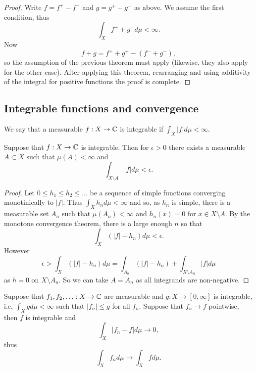 \documentclass[twoside, a4paper, 10pt]{amsart}
\begin{document}
\begin{proof} Write $f = f^+ - f^-$ and $g = g^+ - g^-$ as above. We assume the first condition, thus $$\int_X f^+ + g^+ d\mu < \infty.$$ Now $$f+g = f^+ + g^+ - (f^- + g^-),$$ so the assumption of the previous theorem must apply (likewise, they also apply for the other case). After applying this theorem, rearranging and using additivity of the integral for positive functions the proof is complete. \end{proof}

\subsection{Integrable functions and convergence}

We say that a measurable $f:X \to \mathbb{C}$ is integrable if $\int_X |f| d\mu <\infty$.

\begin{lemma} Suppose that $f:X \to \mathbb{C}$ is integrable. Then for $\epsilon>0$ there exists a measurable $A \subset X$ such that $\mu(A) < \infty$ and $$\int_{X \setminus A} |f| d\mu < \epsilon.$$\end{lemma}

\begin{proof} Let $0 \leq h_1 \leq h_2 \leq \ldots$ be a sequence of simple functions converging monotinically to $|f|$. Thus $\int_{X} h_n d\mu < \infty$ and so, as $h_n$ is simple, there is a measurable set $A_n$ such that $\mu(A_n) < \infty$ and $h_n(x) = 0$ for $x \in X \setminus A$. By the monotone convergence theorem, there is a large enough $n$ so that $$\int_X (|f| - h_n) d\mu < \epsilon.$$ However $$\epsilon > \int_{X}(|f|-h_n) d\mu = \int_{A_n}(|f| - h_n) + \int_{X \setminus A_n} |f| d\mu$$ as $h = 0$ on $X \setminus A_n$. So we can take $A = A_n$ as all integrands are non-negative. \end{proof}

\begin{thm} Suppose that $f_1,f_2,\ldots :X \to \mathbb{C}$ are measurable and $g:X \to [0,\infty]$ is integrable, i.e, $\int_X g d\mu < \infty$ such that $|f_n| \leq g$ for all $f_n$. Suppose that $f_n \to f$ pointwise, then $f$ is integrable and $$\int_X |f_n - f| d\mu \to 0,$$ 
thus
$$\int_X f_n d\mu \to \int_X f d\mu.$$

\end{thm}
\end{document}
